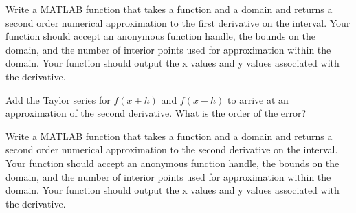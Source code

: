 
\begin{problem}
    Write a MATLAB function that takes a function and a domain and returns a second order
    numerical approximation to the first derivative on the interval.  Your function should
    accept an anonymous function handle, the bounds on the domain, and the number of
    interior points used for approximation within the domain. Your function should output
    the x values and y values associated with the derivative.\\
\end{problem}


\begin{problem}\label{prob:numdiff4}
    Add the Taylor series for $f(x+h)$ and $f(x-h)$ to arrive at an approximation of the
    second derivative. What is the order of the error?  
\end{problem}

\begin{problem}
    Write a MATLAB function that takes a function and a domain and returns a second order
    numerical approximation to the second derivative on the interval.  Your function should
    accept an anonymous function handle, the bounds on the domain, and the number of
    interior points used for approximation within the domain. Your function should output
    the x values and y values associated with the derivative.\\
\end{problem}

